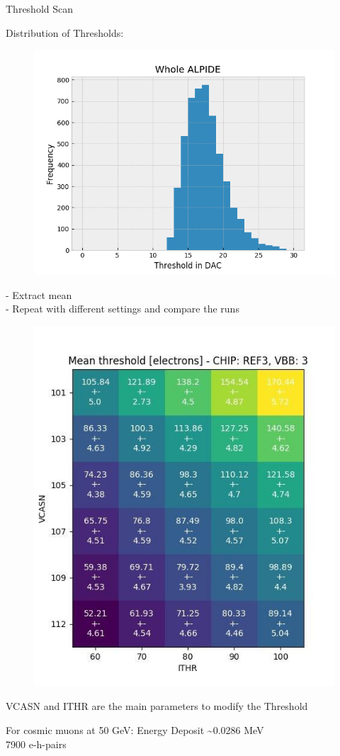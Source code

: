 \documentclass{beamer}
\begin{document}
\begin{frame}{Threshold Scan}
    \begin{minipage}{.49\textwidth}
    Distribution of Thresholds:
    \begin{figure}[H]
       \centering
       \includegraphics[trim=0 0 0 40,clip,width=.9\textwidth]{landau.png}
    \end{figure} 
    \end{minipage}
    \begin{minipage}{.49\textwidth}
	- Extract mean\\
	\pause
	- Repeat with different settings and compare the runs
	\begin{figure}[H]
	    \centering
	    \includegraphics[trim=0 0 0 50, clip, width=.9\textwidth]{thresholdmap.jpg}
	\end{figure}
	\tiny VCASN and ITHR are the main parameters to modify the Threshold
    \end{minipage}
    \pause
    For cosmic muons at 50 GeV:
    Energy Deposit \textasciitilde 0.0286 MeV\\
    7900 e-h-pairs
\end{frame}
\end{document}
